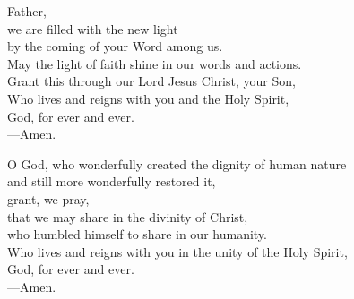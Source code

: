 \prayer

\begin{prayerverse}

Father,\\
we are filled with the new light\\
by the coming of your Word among us.\\
May the light of faith shine in our words and actions.\\
Grant this through our Lord Jesus Christ, your Son,\\
Who lives and reigns with you and the Holy Spirit,\\
God, for ever and ever.\\
{\color{red}---\thinspace}Amen.

\end{prayerverse}


\begin{prayerverse}

O God, who wonderfully created the dignity of human nature\\
and still more wonderfully restored it,\\
grant, we pray,\\
that we may share in the divinity of Christ,\\
who humbled himself to share in our humanity.\\
Who lives and reigns with you in the unity of the Holy Spirit,\\
God, for ever and ever.\\
{\color{red}---\thinspace}Amen.

\end{prayerverse}